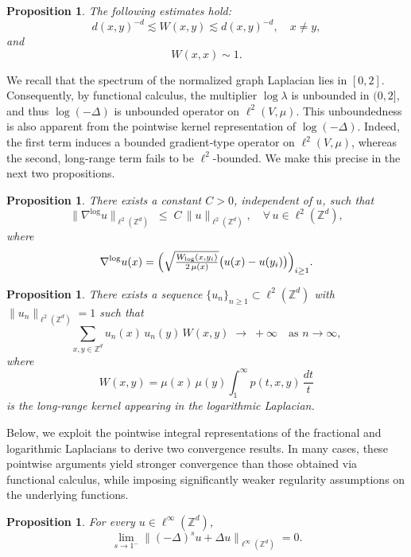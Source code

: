 \documentclass[reqno,12pt]{amsart}
\numberwithin{equation}{section}
\newtheorem{proposition}[theorem]{Proposition}
\begin{document}
\begin{proposition}\label{prop:Wxy11}
	The following estimates hold:
	\[
	d(x,y)^{-d}\lesssim
	W(x,y)\lesssim d(x,y)^{-d},
	\quad x\ne y,
	\]
	and $$	W(x,x)\sim 1.$$
\end{proposition}

We recall that the spectrum of the normalized graph Laplacian lies in \([0,2]\).  Consequently, by functional calculus, the multiplier \(\log\lambda\) is unbounded in \((0,2]\), and thus \(\log(-\Delta)\)  is unbounded operator on \(\ell^2(V,\mu)\).  This unboundedness is also apparent from the pointwise kernel representation of \(\log(-\Delta)\).  Indeed, the first term induces a bounded gradient‐type operator on \(\ell^2(V,\mu)\), whereas the second, long‐range term fails to be \(\ell^2\)-bounded.  We make this precise in the next two propositions.

\begin{proposition}\label{prop:unbounded22}
	There exists a constant \(C>0\), independent of \(u\), such that
	\[
	\bigl\|\nabla^{\log}u\bigr\|_{\ell^2(\mathbb{Z}^d)}
	\;\le\;
	C\,\|u\|_{\ell^2(\mathbb{Z}^d)},
	\quad\forall\,u\in\ell^2(\mathbb{Z}^d),
	\]
	where
\[
\nabla^{\log}u(x)
=\Bigl(
\sqrt{\tfrac{W_{\log}(x,y_i)}{2\,\mu(x)}}\bigl(u(x)-u(y_i)\bigr)
\Bigr)_{i\ge1}.
\]

\end{proposition}

\begin{proposition}\label{prop:unbounded11}
	There exists a sequence \(\{u_n\}_{n\ge1}\subset\ell^2(\mathbb{Z}^d)\) with $\|u_n\|_{\ell^2(\mathbb{Z}^d)}=1$
	such that
	\[
	\sum_{x,y\in\mathbb{Z}^d}u_n(x)\,u_n(y)\,W(x,y)
	\;\longrightarrow\;+\infty
	\quad\text{as }n\to\infty,
	\]
	where
	\[
	W(x,y)
	=\mu(x)\,\mu(y)\int_1^\infty p(t,x,y)\,\frac{dt}{t}
	\]
	is the long‐range kernel appearing in the logarithmic Laplacian.
\end{proposition}

Below, we exploit the pointwise integral representations of the fractional and logarithmic Laplacians to derive two convergence results.  In many cases, these pointwise arguments yield stronger convergence than those obtained via functional calculus, while imposing significantly weaker regularity assumptions on the underlying functions.


\begin{proposition}\label{slx22211}
	For every \(u \in \ell^\infty(\mathbb{Z}^d)\),
	\[
	\lim_{s\to 1^-} \bigl\| (-\Delta)^s u + \Delta u \bigr\|_{\ell^\infty(\mathbb{Z}^d)} = 0.
	\]
\end{proposition}
\end{document}
